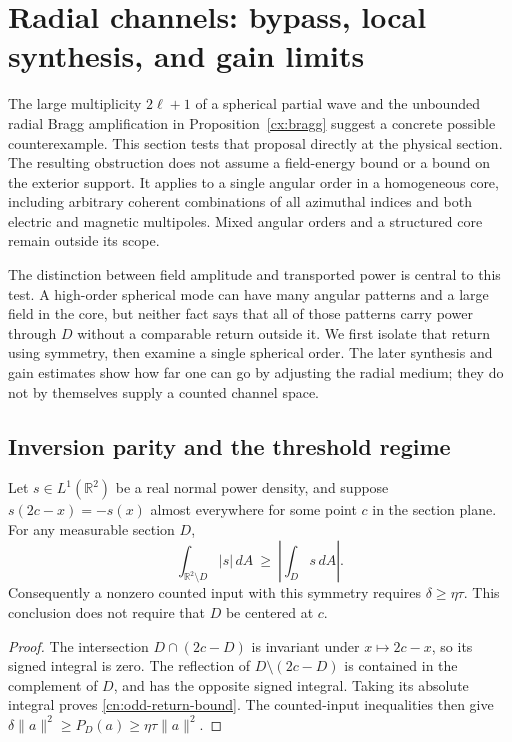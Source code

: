 \section{Radial channels: bypass, local synthesis, and gain limits}
\label{cn:section}

The large multiplicity $2\ell+1$ of a spherical partial wave and the
unbounded radial Bragg amplification in Proposition~\ref{cx:bragg}
suggest a concrete possible counterexample.  This section tests that
proposal directly at the physical section.  The resulting obstruction
does not assume a field-energy bound or a bound on the exterior support.
It applies to a single angular order in a homogeneous core, including
arbitrary coherent combinations of all azimuthal indices and both
electric and magnetic multipoles.  Mixed angular orders and a structured
core remain outside its scope.

The distinction between field amplitude and transported power is central to
this test. A high-order spherical mode can have many angular patterns and a
large field in the core, but neither fact says that all of those patterns
carry power through $D$ without a comparable return outside it. We first
isolate that return using symmetry, then examine a single spherical order.
The later synthesis and gain estimates show how far one can go by adjusting
the radial medium; they do not by themselves supply a counted channel space.

\subsection{Inversion parity and the threshold regime}

\begin{proposition}
\label{cn:odd-return}
Let $s\in L^1(\mathbb R^2)$ be a real normal power density, and suppose
$s(2c-x)=-s(x)$ almost everywhere for some point $c$ in the section
plane.  For any measurable section $D$,
\begin{equation}\label{cn:odd-return-bound}
 \int_{\mathbb R^2\setminus D}|s|\,dA
 \ \geq\ \left|\int_Ds\,dA\right|.
\end{equation}
Consequently a nonzero counted input with this symmetry requires
$\delta\geq\eta\tau$.  This conclusion does not require that $D$ be
centered at $c$.
\end{proposition}
\begin{proof}
The intersection $D\cap(2c-D)$ is invariant under $x\mapsto2c-x$,
so its signed integral is zero.  The reflection of
$D\setminus(2c-D)$ is contained in the complement of $D$, and has the
opposite signed integral.  Taking its absolute integral proves
\eqref{cn:odd-return-bound}.  The counted-input inequalities then give
$\delta\|a\|^2\geq P_D(a)\geq\eta\tau\|a\|^2$.
\end{proof}

